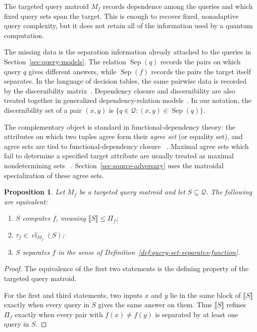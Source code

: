\documentclass[11pt]{article}
\numberwithin{equation}{section}
\newtheorem{proposition}[definition]{Proposition}
\theoremstyle{remark}
\newcommand{\cl}{\operatorname{cl}}
\begin{document}
The targeted query matroid $M_f$ records dependence among the queries and
which fixed query sets span the target. This is enough to recover fixed,
nonadaptive query complexity, but it does not retain all of the information
used by a quantum computation.

The missing data is the separation information already attached to the queries in Section~\ref{sec:query-models}. The relation $\operatorname{Sep}(q)$ records the pairs on which query $q$ gives different answers, while $\operatorname{Sep}(f)$ records the pairs the target itself separates. In the language of decision tables, the same pairwise data is recorded by the discernibility matrix~\cite{SkowronRauszer1992}. Dependency closure and discernibility are also treated together in generalized dependency-relation models~\cite{ChiaselottiGentileInfusino2017,ChiaselottiInfusino2018}. In our notation, the discernibility set of a pair $(x,y)$ is $\{q\in\mathcal Q:(x,y)\in\operatorname{Sep}(q)\}$.

The complementary object is standard in functional-dependency theory: the
attributes on which two tuples agree form their \emph{agree set} (or
equality set), and agree sets are tied to functional-dependency closure
~\cite{GinsburgHull1983}. Maximal agree sets which fail to determine a
specified target attribute are usually treated as maximal nondetermining sets
~\cite{LopesPetitLakhal2001}. Section~\ref{sec:source-adversary} uses the
matroidal specialization of these agree sets.

\begin{proposition}
\label{prop:query-separation-cover}
Let $M_f$ be a targeted query matroid and let $S\subseteq\mathcal Q$. The following are equivalent:
\begin{enumerate}
    \item $S$ computes $f$, meaning $\llbracket S\rrbracket\leq\Pi_f$;
    \item $\tau_f\in\cl_{M_f}(S)$;
    \item $S$ separates $f$ in the sense of Definition~\ref{def:query-set-separates-function}.
\end{enumerate}
\end{proposition}

\begin{proof}
The equivalence of the first two statements is the defining property of the
targeted query matroid.

For the first and third statements, two inputs $x$ and $y$ lie in the same
block of $\llbracket S\rrbracket$ exactly when every query in $S$ gives the
same answer on them. Thus $\llbracket S\rrbracket$ refines $\Pi_f$ exactly
when every pair with $f(x)\neq f(y)$ is separated by at least one query in
$S$.
\end{proof}
\end{document}
